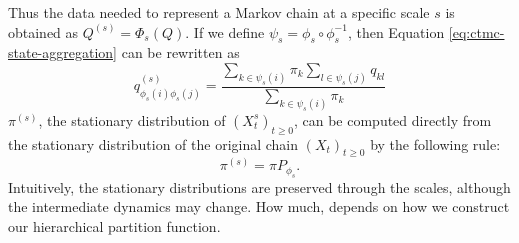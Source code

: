 Thus the data needed to represent a Markov chain at a specific scale $s$ is obtained as $Q^{(s)} = \Phi_s(Q)$.
If we define $\psi_s = \phi_s \circ \phi_s^{-1}$, then Equation \ref{eq:ctmc-state-aggregation} can be rewritten as
\begin{equation}
	\label{eq:ctmc-aggregation-alternative}
	q_{\phi_s(i)\phi_s(j)}^{(s)} = \frac{\sum_{k \in \psi_s(i)}\pi_k \sum_{l \in \psi_s(j)} q_{kl}}{\sum_{k \in \psi_s(i)}\pi_k}
\end{equation}
$\pi^{(s)}$, the stationary distribution of $(X_t^{s})_{t \ge 0}$, can be computed directly from
the stationary distribution of the original chain $(X_t)_{t \ge 0}$ by the following rule:
\begin{equation}
	\nonumber
	\pi^{(s)} = \pi P_{\phi_s}.
\end{equation}
Intuitively, the stationary distributions are preserved through the scales, although the intermediate dynamics may change. How much, depends on how we construct our hierarchical partition function. 

 

